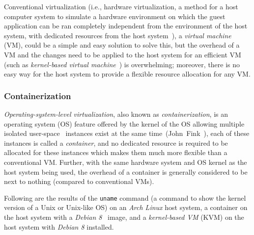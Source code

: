 \medskip

Conventional virtualization (i.e., hardware virtualization, a method for a
host computer system to simulate a hardware environment on which the guest
application can be ran completely independent from the environment of the host
system, with dedicated resources from the host system~\citep[Chap.~16]{os}),
a \emph{virtual machine} (VM), could be a simple and easy solution to solve
this, but the overhead of a VM and the changes need to be applied to the host
system for an efficient VM (such as 
\emph{kernel-based virtual machine}~\cite{kvm}) is overwhelming;
moreover, there is no easy way for the host system to provide a flexible
resource allocation for any VM.

\subsubsection{Containerization}
\emph{Operating-system-level virtualization}, also known as
\emph{containerization}, is an operating system (OS) feature offered by the
kernel of the OS allowing multiple isolated user-space~\citep[Sec.~1.5.1]{os}
instances exist at the same time~(John~Fink~\cite{docker}),
each of these instances is called a \emph{container}, and no dedicated resource
is required to be allocated for these instances which makes them much more
flexible than a conventional VM. Further, with the same hardware system and
OS kernel as the host system being used, the overhead of a container is
generally considered to be next to nothing (compared to conventional VMs).

\pagebreak

Following are the results of the \texttt{uname} command
(a command to show the kernel version of a Unix or Unix-like OS)
on an \emph{Arch Linux} host system, a container on the host system
with a \emph{Debian 8}~\cite{debian} image, and a \emph{kernel-based VM} (KVM)
on the host system with \emph{Debian 8} installed.

\begin{centering}



\end{centering}

